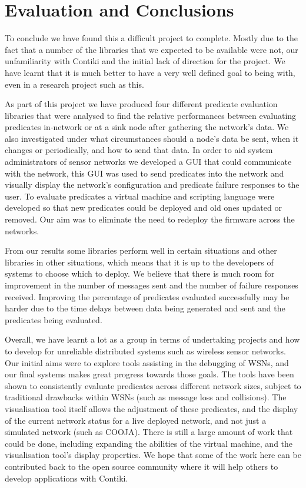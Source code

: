 \section{Evaluation and Conclusions}

To conclude we have found this a difficult project to complete. Mostly due to the fact that a number of the libraries that we expected to be available were not, our unfamiliarity with Contiki and the initial lack of direction for the project. We have learnt that it is much better to have a very well defined goal to being with, even in a research project such as this.

As part of this project we have produced four different predicate evaluation libraries that were analysed to find the relative performances between evaluating predicates in-network or at a sink node after gathering the network's data. We also investigated under what circumstances should a node's data be sent, when it changes or periodically, and how to send that data. In order to aid system administrators of sensor networks we developed a GUI that could communicate with the network, this GUI was used to send predicates into the network and visually display the network's configuration and predicate failure responses to the user. To evaluate predicates a virtual machine and scripting language were developed so that new predicates could be deployed and old ones updated or removed. Our aim was to eliminate the need to redeploy the firmware across the networks.

From our results some libraries perform well in certain situations and other libraries in other situations, which means that it is up to the developers of systems to choose which to deploy. We believe that there is much room for improvement in the number of messages sent and the number of failure responses received. Improving the percentage of predicates evaluated successfully may be harder due to the time delays between data being generated and sent and the predicates being evaluated.


Overall, we have learnt a lot as a group in terms of undertaking projects and how to develop for unreliable distributed systems such as wireless sensor networks. Our initial aims were to explore tools assisting in the debugging of WSNs, and our final systems makes great progress towards those goals. The tools have been shown to consistently evaluate predicates across different network sizes, subject to traditional drawbacks within WSNs (such as message loss and collisions). The visualisation tool itself allows the adjustment of these predicates, and the display of the current network status for a live deployed network, and not just a simulated network (such as COOJA). There is still a large amount of work that could be done, including expanding the abilities of the virtual machine, and the visualisation tool's display properties. We hope that some of the work here can be contributed back to the open source community where it will help others to develop applications with Contiki.

